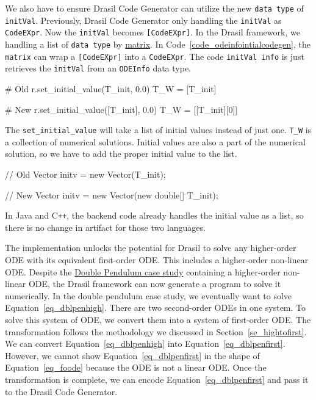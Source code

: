 We also have to ensure Drasil Code Generator can utilize the new \verb|data type| of \verb|initVal|. Previously, Drasil Code Generator only handling the \verb|initVal| as \verb|CodeEXpr|. Now the \verb|initVal| becomes \verb|[CodeEXpr]|. In the Drasil framework, we handling a list of \verb|data type| by \href{https://jacquescarette.github.io/Drasil/docs/drasil-code-base-0.1.9.0/Language-Drasil-CodeExpr.html#v:matrix}{matrix}. In Code~\ref{code_odeinfointialcodegen}, the \verb|matrix| can wrap a \verb|[CodeEXpr]| into a \verb|CodeEXpr|. The code \verb|initVal info| is just retrieves the \verb|initVal| from an \verb|ODEInfo| data type.

\begin{listing}[ht]
\begin{python1}
# Old 
  r.set_initial_value(T_init, 0.0)
  T_W = [T_init]

# New 
  r.set_initial_value([T_init], 0.0)
  T_W = [[T_init][0]]
\end{python1}
\end{listing}

The \verb|set_initial_value| will take a list of initial values instead of just one. \verb|T_W| is a collection of numerical solutions. Initial values are also a part of the numerical solution, so we have to add the proper initial value to the list.

\begin{listing}[ht]
\begin{csharp1}
// Old 
Vector initv = new Vector(T_init);

// New 
Vector initv = new Vector(new double[] {T_init});
\end{csharp1}
\end{listing}

In Java and C\texttt{++}, the backend code already handles the initial value as a list, so there is no change in artifact for those two languages. 

The implementation unlocks the potential for Drasil to solve any higher-order ODE with its equivalent first-order ODE. This includes a higher-order non-linear ODE. Despite the \href{https://jacquescarette.github.io/Drasil/examples/dblpendulum/SRS/srs/DblPendulum_SRS.html#Sec:IMs}{Double Pendulum case study} containing a higher-order non-linear ODE, the Drasil framework can now generate a program to solve it numerically. In the double pendulum case study, we eventually want to solve Equation~\ref{eq_dblpenhigh}. There are two second-order ODEs in one system. To solve this system of ODE, we convert them into a system of first-order ODE. The transformation follows the methodology we discussed in Section~\ref{se_hightofirst}. We can convert Equation~\ref{eq_dblpenhigh} into Equation~\ref{eq_dblpenfirst}. However, we cannot show Equation~\ref{eq_dblpenfirst} in the shape of Equation~\ref{eq_foode} because the ODE is not a linear ODE. Once the transformation is complete, we can encode Equation~\ref{eq_dblpenfirst} and pass it to the Drasil Code Generator.

